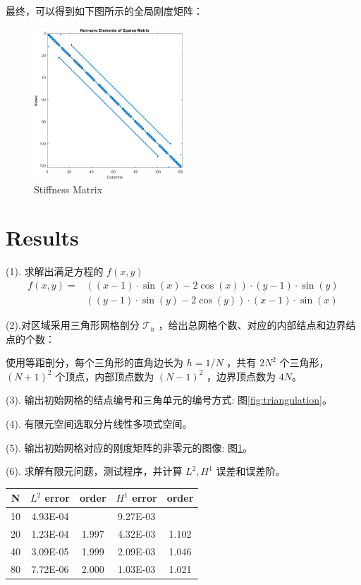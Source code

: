 \documentclass[11pt]{ctexart}
\begin{document}
最终，可以得到如下图所示的全局刚度矩阵：
\begin{figure}[htbp]
  \centering
  \includegraphics[width=0.5\textwidth]{stiffness.png}
  \caption{Stiffness Matrix}
  \label{fig:stiffness}
\end{figure}

\section{Results}

(1). 求解出满足方程的 $ f(x,y) $
\begin{equation}
  \begin{aligned}
    f(x,y) = &((x-1) \cdot \sin(x)-2\cos(x)) \cdot (y-1) \cdot \sin(y)\\
    &((y-1)\cdot\sin(y)-2\cos(y))\cdot(x-1) \cdot \sin(x)
  \end{aligned}
\end{equation}

(2).对区域采用三角形网格剖分 $ \mathcal{T}_h $ ，给出总网格个数、对应的内部结点和边界结点的个数：

使用等距剖分，每个三角形的直角边长为 $ h=1/N$ ，共有 $ 2N^2 $ 个三角形，$ (N+1)^2 $ 个顶点，内部顶点数为 $ (N-1)^2 $ ，边界顶点数为 $ 4N$。

(3). 输出初始网格的结点编号和三角单元的编号方式: 图\ref{fig:triangulation}。

(4). 有限元空间选取分片线性多项式空间。

(5). 输出初始网格对应的刚度矩阵的非零元的图像: 图\ref{fig:stiffness}。

(6). 求解有限元问题，测试程序，并计算 $ L^2,H^1 $ 误差和误差阶。
\begin{table}[htbp]
  \centering
  \begin{tabular}{|c|cc|cc|}
    \toprule
    N & \multicolumn{1}{c}{$L^2$ error} & \multicolumn{1}{c|}{order} & \multicolumn{1}{c}{$H^1$ error} & \multicolumn{1}{c|}{order} \\
    \midrule
    10  & 4.93E-04 &       & 9.27E-03 &       \\
    20  & 1.23E-04 & 1.997 & 4.32E-03 & 1.102 \\
    40  & 3.09E-05 & 1.999 & 2.09E-03 & 1.046 \\
    80  & 7.72E-06 & 2.000 & 1.03E-03 & 1.021 \\  
    \bottomrule
  \end{tabular}%
  \label{tab:error}%
\end{table}%
\end{document}

